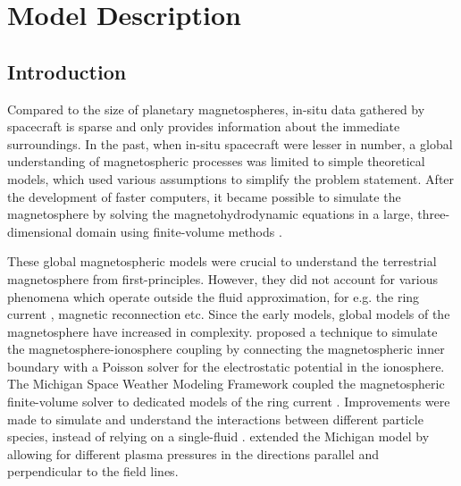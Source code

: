 
\chapter{Model Description}


\section{Introduction}

Compared to the size of planetary magnetospheres, in-situ data gathered by spacecraft is sparse and only provides information about the immediate surroundings. In the past, when in-situ spacecraft were lesser in number, a global understanding of magnetospheric processes was limited to simple theoretical models, which used various assumptions to simplify the problem statement. After the development of faster computers, it became possible to simulate the magnetosphere by solving the magnetohydrodynamic equations in a large, three-dimensional domain using finite-volume methods \cite{Leboeuf1978GlobalMagnetosphere,Walker1989GlobalMagnetosphere,Ashour-Abdalla1985SpaceSimulations}. 

These global magnetospheric models were crucial to understand the terrestrial magnetosphere from first-principles. However, they did not account for various phenomena which operate outside the fluid approximation, for e.g. the ring current \cite{Fok1999ModelingSubstorms}, magnetic reconnection \cite{Birn2001GeospaceChallenge} etc. Since the early models, global models of the magnetosphere have increased in complexity.  proposed a technique to simulate the magnetosphere-ionosphere coupling by connecting the magnetospheric inner boundary with a Poisson solver for the electrostatic potential in the ionosphere. The Michigan Space Weather Modeling Framework coupled the magnetospheric finite-volume solver to dedicated models of the ring current \cite{DeZeeuw2004CouplingResults}. Improvements were made to simulate and understand the interactions between different particle species, instead of relying on a single-fluid \cite{Glocer2009MultifluidResults,Wiltberger2010InfluenceMagnetosphere}.  extended the Michigan model by allowing for different plasma pressures in the directions parallel and perpendicular to the field lines. 

